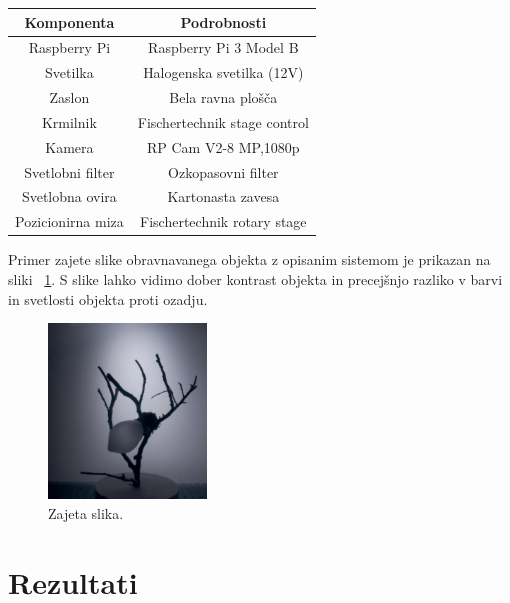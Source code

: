 \documentclass[journal,a4paper,twoside]{sty/IEEEtran}
\begin{document}
\begin{center}
	\centering
	\captionsetup{singlelinecheck = false, justification=justified}
	\label{tab:komponente} 
\begin{tabular}{|c|c|}
	\hline
	\textbf{Komponenta} & \textbf{Podrobnosti}                            \\ \hline
	Raspberry Pi        & Raspberry Pi 3 Model B                          \\ \hline
	Svetilka            & Halogenska svetilka (12V)            \\ \hline
	Zaslon              & Bela ravna plošča                               \\ \hline
	Krmilnik            & Fischertechnik stage control                \\ \hline
	Kamera              & RP Cam V2-8 MP,1080p \\ \hline
	Svetlobni filter    & Ozkopasovni filter         \\ \hline
	Svetlobna ovira     & Kartonasta zavesa                \\ \hline
		Pozicionirna miza   & Fischertechnik rotary stage                     \\ \hline
\end{tabular}
\end{center}
Primer zajete slike obravnavanega objekta z opisanim sistemom je prikazan na sliki ~\ref{fig:zajeta_slika}. S slike lahko vidimo dober kontrast objekta in precejšnjo razliko v barvi in svetlosti objekta proti ozadju. 

\begin{figure}[H]
	\centerline{\includegraphics[width=4.2cm]{fig/zajeta_slika}}
	\caption{Zajeta slika.}
	\label{fig:zajeta_slika}
\end{figure}

\section{Rezultati}
\end{document}
